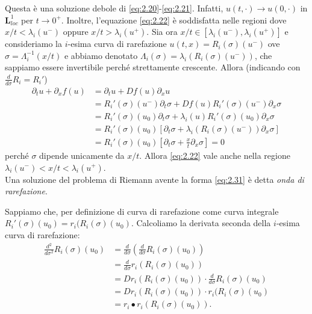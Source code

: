 Questa è una soluzione debole di \eqref{eq:2.20}-\eqref{eq:2.21}. Infatti, $u(t,\cdot)\rightarrow u(0,\cdot)$ in $\mathbf{L}^{1}_{loc}$ per $t\rightarrow 0^{+}$. Inoltre, l'equazione \eqref{eq:2.22} è soddisfatta nelle regioni dove $x/t < \lambda_{i}(u^{-})$ oppure $x/t>\lambda_{i}(u^{+})$. Sia ora $x/t\in [\lambda_{i}(u^{-}),\lambda_{i}(u^{+})]$ e consideriamo la $i$-esima curva di rarefazione $u(t,x)=R_{i}(\sigma)(u^{-})$ ove $\sigma = \Lambda_{i}^{-1}(x/t)$ e abbiamo denotato $\Lambda_{i}(\sigma) = \lambda_{i}(R_{i}(\sigma)(u^{-}))$, che sappiamo essere invertibile perché strettamente crescente. Allora (indicando con $\frac{d}{d\sigma} R_{i}=R_{i}' $)
\begin{align*}
    \partial_{t}u+\partial_{x}f(u) &= \partial_{t}u+Df(u)\partial_{x}u\\
    &= R_{i}'(\sigma)(u^{-})\partial_{t}\sigma + Df(u)R_{i}'(\sigma)(u^{-})\partial_{x}\sigma\\
    &=R_{i}'(\sigma)(u_{0})\partial_{t}\sigma+\lambda_{i}(u)R_{i}'(\sigma)(u_{0})\partial_{x}\sigma\\
    &=R_{i}'(\sigma)(u_{0})\left[\partial_{t}\sigma + \lambda_{i}(R_{i}(\sigma)(u^{-}))\partial_{x}\sigma\right]\\
    &=R_{i}'(\sigma)(u_{0})\left[\partial_{t}\sigma + \frac{x}{t}\partial_{x}\sigma\right] = 0
\end{align*}
perché $\sigma$ dipende unicamente da $x/t$.
Allora \eqref{eq:2.22} vale anche nella regione $\lambda_{i}(u^{-})<x/t<\lambda_{i}(u^{+})$.\\
Una soluzione del problema di Riemann avente la forma \eqref{eq:2.31} è detta \textit{onda di rarefazione}.
\begin{osservazione}
    Sappiamo che, per definizione di curva di rarefazione come curva integrale $R_{i}'(\sigma)(u_{0})=r_{i}(R_{i}(\sigma)(u_{0})$. Calcoliamo la derivata seconda della $i$-esima curva di rarefazione:
    \begin{align}
        \frac{d^{2}}{d\sigma^{2}}R_{i}(\sigma)(u_{0}) &= \frac{d}{d\sigma}\left(\frac{d}{d\sigma}R_{i}(\sigma)(u_{0})\right)\nonumber\\
        &=\frac{d}{d\sigma}r_{i}(R_{i}(\sigma)(u_{0}))\nonumber\\
        &= Dr_{i}(R_{i}(\sigma)(u_{0}))\cdot \frac{d}{d\sigma}R_{i}(\sigma)(u_{0})\nonumber\\
        &= Dr_{i}(R_{i}(\sigma)(u_{0}))\cdot r_{i}(R_{i}(\sigma)(u_{0})\nonumber\\
        &= r_{i}\bullet r_{i}(R_{i}(\sigma)(u_{0})).
    \end{align}
\end{osservazione}
